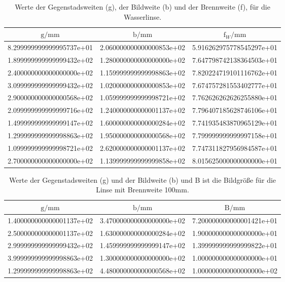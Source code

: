 \begin{table}
  \centering
  \begin{tabular}{S[round-precision = 0] S[round-precision = 0] S}
    \toprule
    $\text{g} / \si{\milli\meter}$ &
     $\text{b}/\si{\milli\meter} $ & $\text{f}_W / \si{\milli\meter} $\\
    \midrule
      8.299999999999995737e+01 & 2.060000000000000853e+02 & 5.916262975778545297e+01\\
      1.899999999999999432e+02 & 1.280000000000000000e+02 & 7.647798742138364503e+01\\
      2.400000000000000000e+02 & 1.159999999999998863e+02 & 7.820224719101116762e+01\\
      3.099999999999999432e+02 & 1.020000000000000853e+02 & 7.674757281553402777e+01\\
      2.900000000000000568e+02 & 1.059999999999998721e+02 & 7.762626262626255880e+01\\
      2.099999999999999716e+02 & 1.240000000000001137e+02 & 7.796407185628746106e+01\\
      1.499999999999999147e+02 & 1.600000000000000284e+02 & 7.741935483870965129e+01\\
      1.299999999999998863e+02 & 1.950000000000000568e+02 & 7.799999999999997158e+01\\
      1.099999999999998721e+02 & 2.620000000000001137e+02 & 7.747311827956984587e+01\\
      2.700000000000000000e+02 & 1.139999999999999858e+02 & 8.015625000000000000e+01\\
    \bottomrule
  \end{tabular}
  \caption{Werte der Gegenstadsweiten (g), der Bildweite (b)
  und der Brennweite (f), für die Wasserlinse.}
  \label{tab:Wgb}
\end{table}
\begin{table}
  \centering
  \begin{tabular}{S[round-precision = 0] S[round-precision = 0] S }
    \toprule
    $\text{g} / \si{\milli\meter}$ &
     $\text{b}/\si{\milli\meter} $ & $\text{B} / \si{\milli\meter} $\\
    \midrule
    1.400000000000001137e+02 & 3.470000000000000000e+02 & 7.200000000000001421e+01\\
    2.500000000000001137e+02 & 1.630000000000000284e+02 & 1.900000000000000000e+01\\
    2.999999999999999432e+02 & 1.459999999999999147e+02 & 1.399999999999999822e+01\\
    3.999999999999998863e+02 & 1.300000000000000000e+02 & 1.000000000000000000e+01\\
    1.299999999999998863e+02 & 4.480000000000000568e+02 & 1.000000000000000000e+02\\
    \bottomrule
  \end{tabular}
 \caption{Werte der Gegenstadsweiten (g) und der Bildweite (b)
  und B ist die Bildgröße für die Linse mit Brennweite 100mm.}
  \label{tab:Bgb}
\end{table}

